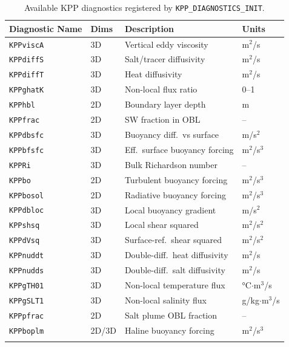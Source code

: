 \documentclass[12pt,letterpaper]{article}
\begin{document}
\begin{longtable}{l l l l}  
\toprule  
\textbf{Diagnostic Name} & \textbf{Dims} & \textbf{Description} &  
\textbf{Units} \\  
\midrule  
\endhead  
\texttt{KPPviscA}  & 3D & Vertical eddy viscosity & m$^2$/s \\  
\texttt{KPPdiffS}  & 3D & Salt/tracer diffusivity & m$^2$/s \\  
\texttt{KPPdiffT}  & 3D & Heat diffusivity & m$^2$/s \\  
\texttt{KPPghatK}  & 3D & Non-local flux ratio & 0--1 \\  
\texttt{KPPhbl}    & 2D & Boundary layer depth & m \\  
\texttt{KPPfrac}   & 2D & SW fraction in OBL & -- \\  
\texttt{KPPdbsfc}  & 3D & Buoyancy diff.\ vs surface & m/s$^2$ \\  
\texttt{KPPbfsfc}  & 3D & Eff.\ surface buoyancy forcing & m$^2$/s$^3$ \\  
\texttt{KPPRi}     & 3D & Bulk Richardson number & -- \\  
\texttt{KPPbo}     & 2D & Turbulent buoyancy forcing & m$^2$/s$^3$ \\  
\texttt{KPPbosol}  & 2D & Radiative buoyancy forcing & m$^2$/s$^3$ \\  
\texttt{KPPdbloc}  & 3D & Local buoyancy gradient & m/s$^2$ \\  
\texttt{KPPshsq}   & 3D & Local shear squared & m$^2$/s$^2$ \\  
\texttt{KPPdVsq}   & 3D & Surface-ref.\ shear squared & m$^2$/s$^2$ \\  
\texttt{KPPnuddt}  & 3D & Double-diff.\ heat diffusivity & m$^2$/s \\  
\texttt{KPPnudds}  & 3D & Double-diff.\ salt diffusivity & m$^2$/s \\  
\texttt{KPPgTH01}  & 3D & Non-local temperature flux & °C$\cdot$m$^3$/s \\  
\texttt{KPPgSLT1}  & 3D & Non-local salinity flux & g/kg$\cdot$m$^3$/s \\  
\texttt{KPPpfrac}  & 2D & Salt plume OBL fraction & -- \\  
\texttt{KPPboplm}  & 2D/3D & Haline buoyancy forcing & m$^2$/s$^3$ \\  
\bottomrule  
\caption{Available KPP diagnostics registered by  
         \texttt{KPP\_DIAGNOSTICS\_INIT}.}  
\end{longtable}  
  
\end{document}
